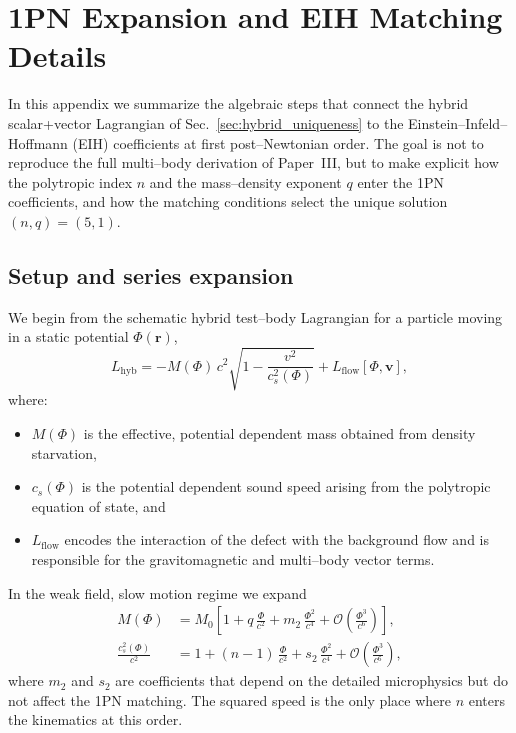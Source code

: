 \documentclass[11pt]{article}
\begin{document}
\appendix

\section{1PN Expansion and EIH Matching Details}
\label{app:1pn_details}

In this appendix we summarize the algebraic steps that connect the hybrid
scalar+vector Lagrangian of Sec.~\ref{sec:hybrid_uniqueness} to the
Einstein--Infeld--Hoffmann (EIH) coefficients at first post--Newtonian
order.  The goal is not to reproduce the full multi--body derivation of
Paper~III, but to make explicit how the polytropic index \(n\) and the
mass--density exponent \(q\) enter the 1PN coefficients, and how the
matching conditions select the unique solution
\((n,q) = (5,1)\).

\subsection{Setup and series expansion}
\label{app:1pn-setup}

We begin from the schematic hybrid test--body Lagrangian for a particle
moving in a static potential \(\Phi(\mathbf{r})\),
\begin{equation}
  L_{\text{hyb}}
  = -M(\Phi)\,c^2 \sqrt{1 - \frac{v^2}{c_s^2(\Phi)}}
    + L_{\text{flow}}[\Phi,\mathbf{v}],
  \label{eq:L-hyb-app}
\end{equation}
where:
\begin{itemize}
  \item \(M(\Phi)\) is the effective, potential dependent mass obtained from
        density starvation,
  \item \(c_s(\Phi)\) is the potential dependent sound speed arising from
        the polytropic equation of state, and
  \item \(L_{\text{flow}}\) encodes the interaction of the defect with the
        background flow and is responsible for the gravitomagnetic and
        multi--body vector terms.
\end{itemize}
In the weak field, slow motion regime we expand
\begin{align}
  M(\Phi)
  &= M_0 \left[
      1 + q\,\frac{\Phi}{c^2}
        + m_2\,\frac{\Phi^2}{c^4}
        + \mathcal{O}\!\left(\frac{\Phi^3}{c^6}\right)
    \right],
  \label{eq:M-expansion-app} \\
  \frac{c_s^2(\Phi)}{c^2}
  &= 1 + (n-1)\,\frac{\Phi}{c^2}
       + s_2\,\frac{\Phi^2}{c^4}
       + \mathcal{O}\!\left(\frac{\Phi^3}{c^6}\right),
  \label{eq:cs-expansion-app}
\end{align}
where \(m_2\) and \(s_2\) are coefficients that depend on the detailed
microphysics but do not affect the 1PN matching.  The squared speed is the
only place where \(n\) enters the kinematics at this order.
\end{document}

